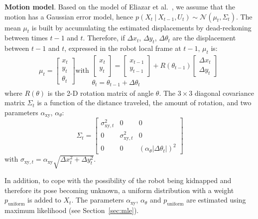 \documentclass{svmult}
\newcommand{\sect}[1]{Section~\ref{sec:#1}}
\begin{document}
\textbf{Motion model}. Based on the model of Eliazar et al.~\cite{eliazar2004motionmodel}, we assume that the motion has a Gaussian error model, hence $p(X_t~|~X_{t-1}, U_{t})\sim\mathcal{N}(\mu_t,\Sigma_t)$.
The mean $\mu_t$ is built by accumulating the estimated displacements by dead-reckoning between times $t-1$ and $t$.
Therefore, if $\Delta x_t$, $\Delta y_t$, $\Delta \theta_t$ are the displacement between $t-1$ and $t$, expressed in the robot local frame at $t-1$, $\mu_t$ is:
\begin{equation}
\mu_t =
\left[ \begin{array}{c} x_t \\ y_t \\ \theta_t \end{array} \right]
\text{with}
\begin{array}{c}
\left[ \begin{array}{c} x_t \\ y_t \end{array} \right] =
\left[ \begin{array}{c} x_{t-1} \\ y_{t-1} \end{array} \right] +
R(\theta_{t-1})
\left[ \begin{array}{c} \Delta x_{t} \\ \Delta y_{t} \end{array} \right]
\\
\theta_t = \theta_{t-1} + \Delta \theta_t
\end{array}
\end{equation}
where $R(\theta)$ is the 2-D rotation matrix of angle $\theta$.
The $3\times3$ diagonal covariance matrix $\Sigma_t$ is a function of the distance traveled, the amount of rotation, and two parameters $\alpha_\mathrm{xy}$, $\alpha_\theta$:
\begin{equation}
\Sigma_t=\begin{bmatrix} \sigma_{\mathrm{xy},t}^2 & 0 & 0 \\ 0 & \sigma_{\mathrm{xy},t}^2 & 0 \\ 0 & 0 & (\alpha_\theta | \Delta \theta_t |)^2 \end{bmatrix}
\end{equation}
with $ \sigma_{\mathrm{xy},t} = \alpha_\mathrm{xy} \sqrt{\Delta x_{t}^2 + \Delta y_{t}^2}$.

In addition, to cope with the possibility of the robot being kidnapped and therefore its pose becoming unknown, a uniform distribution with a weight $p_\mathrm{uniform}$ is added to $X_t$.
The parameters $\alpha_\mathrm{xy}$, $\alpha_\theta$ and $p_\mathrm{uniform}$ are estimated using maximum likelihood (see \sect{mle}).
\end{document}
